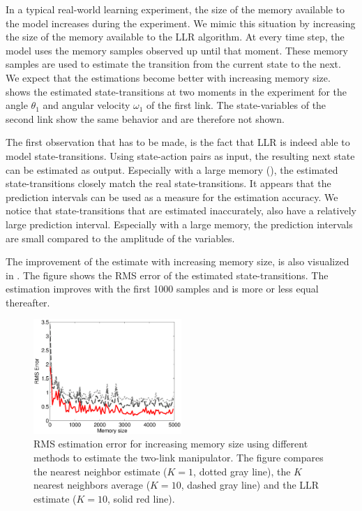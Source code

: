 In a typical real-world learning experiment, the size of the memory available to the model increases during the experiment. We mimic this situation by increasing the size of the memory available to the \ac{LLR} algorithm. At every time step, the model uses the memory samples observed up until that moment. These memory samples are used to estimate the transition from the current state to the next. We expect that the estimations become better with increasing memory size.  shows the estimated state-transitions at two moments in the experiment for the angle $\theta_1$ and angular velocity $\omega_1$ of the first link. The state-variables of the second link show the same behavior and are therefore not shown. 

The first observation that has to be made, is the fact that \ac{LLR} is indeed able to model state-transitions. Using state-action pairs as input, the resulting next state can be estimated as output. Especially with a large memory (), the estimated state-transitions closely match the real state-transitions. It appears that the prediction intervals can be used as a measure for the estimation accuracy. We notice that state-transitions that are estimated inaccurately, also have a relatively large prediction interval. Especially with a large memory, the prediction intervals are small compared to the amplitude of the variables. 

The improvement of the estimate with increasing memory size, is also visualized in . The figure shows the RMS error of the estimated state-transitions. The estimation improves with the first 1000 samples and is more or less equal thereafter.
\begin{figure}[htbp]
	\centering
		\includegraphics[width=0.5\textwidth]{Figures/LLR-robotarm_RMSE_compare}
		\caption[Estimation error for the two-link manipulator for increasing memory size]{\ac{RMS} estimation error for increasing memory size using different methods to estimate the two-link manipulator. The figure compares the nearest neighbor estimate ($K=1$, dotted gray line), the $K$ nearest neighbors average ($K=10$, dashed gray line) and the \ac{LLR} estimate ($K=10$, solid red line).}
	\label{fig:LLR-robotarm_RMSE_compare}
\end{figure}



